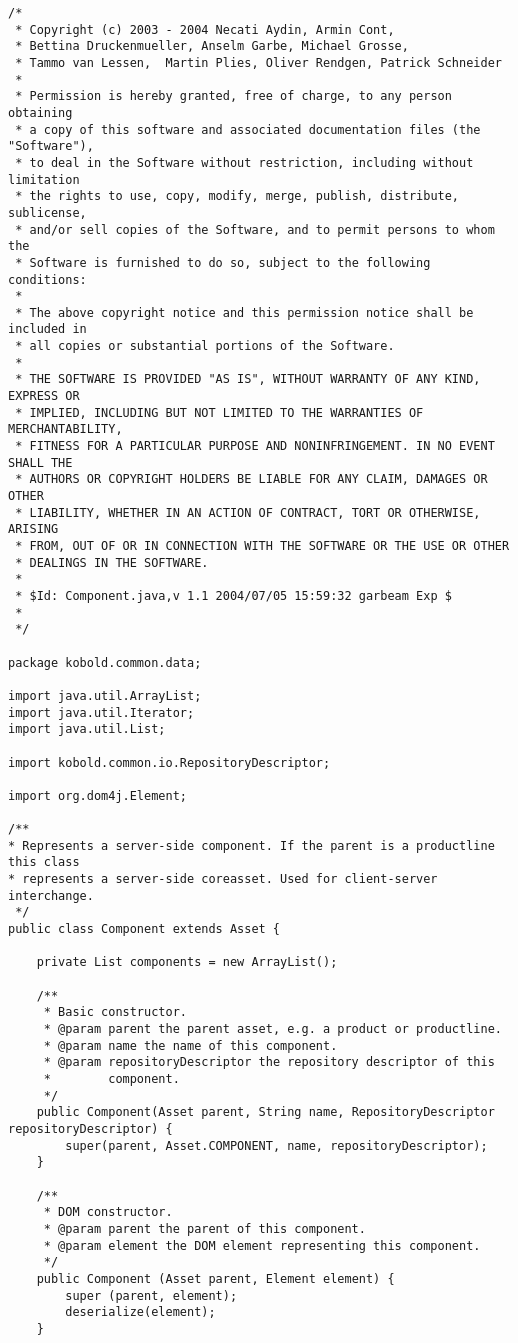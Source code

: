 \small \begin{verbatim}
/*
 * Copyright (c) 2003 - 2004 Necati Aydin, Armin Cont, 
 * Bettina Druckenmueller, Anselm Garbe, Michael Grosse, 
 * Tammo van Lessen,  Martin Plies, Oliver Rendgen, Patrick Schneider
 * 
 * Permission is hereby granted, free of charge, to any person obtaining
 * a copy of this software and associated documentation files (the "Software"),
 * to deal in the Software without restriction, including without limitation
 * the rights to use, copy, modify, merge, publish, distribute, sublicense, 
 * and/or sell copies of the Software, and to permit persons to whom the 
 * Software is furnished to do so, subject to the following conditions:
 *
 * The above copyright notice and this permission notice shall be included in 
 * all copies or substantial portions of the Software.
 *
 * THE SOFTWARE IS PROVIDED "AS IS", WITHOUT WARRANTY OF ANY KIND, EXPRESS OR 
 * IMPLIED, INCLUDING BUT NOT LIMITED TO THE WARRANTIES OF MERCHANTABILITY, 
 * FITNESS FOR A PARTICULAR PURPOSE AND NONINFRINGEMENT. IN NO EVENT SHALL THE 
 * AUTHORS OR COPYRIGHT HOLDERS BE LIABLE FOR ANY CLAIM, DAMAGES OR OTHER 
 * LIABILITY, WHETHER IN AN ACTION OF CONTRACT, TORT OR OTHERWISE, ARISING 
 * FROM, OUT OF OR IN CONNECTION WITH THE SOFTWARE OR THE USE OR OTHER 
 * DEALINGS IN THE SOFTWARE.
 *
 * $Id: Component.java,v 1.1 2004/07/05 15:59:32 garbeam Exp $
 *
 */

package kobold.common.data;

import java.util.ArrayList;
import java.util.Iterator;
import java.util.List;

import kobold.common.io.RepositoryDescriptor;

import org.dom4j.Element;

/**
* Represents a server-side component. If the parent is a productline this class
* represents a server-side coreasset. Used for client-server interchange. 
 */
public class Component extends Asset {

	private List components = new ArrayList();
	
	/**
	 * Basic constructor.
	 * @param parent the parent asset, e.g. a product or productline.
	 * @param name the name of this component.
	 * @param repositoryDescriptor the repository descriptor of this
	 * 		  component.
	 */
	public Component(Asset parent, String name, RepositoryDescriptor repositoryDescriptor) {
		super(parent, Asset.COMPONENT, name, repositoryDescriptor);
	}
	
	/**
	 * DOM constructor.
	 * @param parent the parent of this component.
	 * @param element the DOM element representing this component.
	 */
	public Component (Asset parent, Element element) {
		super (parent, element);
		deserialize(element);
	}
	

\end{verbatim}
